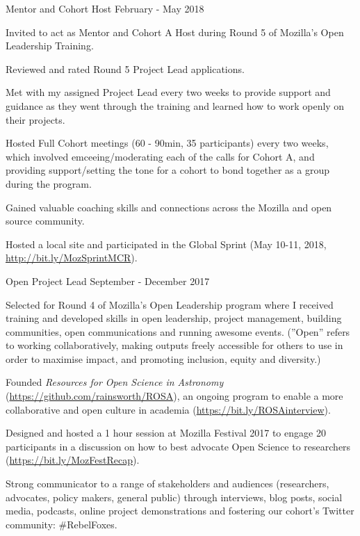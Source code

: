 \begin{cventries}
{    }
\cventry
    {Mentor and Cohort Host}
    {}
    {}
    {February - May 2018}
    {
      \begin{cvitems}
        \item{Invited to act as Mentor and Cohort A Host during Round 5 of Mozilla's Open Leadership Training.}
        \item{Reviewed and rated Round 5 Project Lead applications.}
        \item{Met with my assigned Project Lead every two weeks to provide support and guidance as they went through the training and learned how to work openly on their projects.}
        \item{Hosted Full Cohort meetings (60 - 90min, 35 participants) every two weeks, which involved emceeing/moderating each of the calls for Cohort A, and providing support/setting the tone for a cohort to bond together as a group during the program.}
        \item{Gained valuable coaching skills and connections across the Mozilla and open source community.}
        \item{Hosted a local site and participated in the Global Sprint (May 10-11, 2018, \url{http://bit.ly/MozSprintMCR}).}
      \end{cvitems}
    }
\cventry
    {Open Project Lead}
    {}
    {}
    {September - December 2017}
    {
      \begin{cvitems}
        \item{Selected for Round 4 of Mozilla's Open Leadership program where I received training and developed skills in open leadership, project management, building communities, open communications and running awesome events. (''Open'' refers to working collaboratively, making outputs freely accessible for others to use in order to maximise impact, and promoting inclusion, equity and diversity.)}
        \item{Founded \textit{Resources for Open Science in Astronomy} (\url{https://github.com/rainsworth/ROSA}), an ongoing program to enable a more collaborative and open culture in academia (\url{https://bit.ly/ROSAinterview}).}
        \item {Designed and hosted a 1 hour session at Mozilla Festival 2017 to engage 20 participants in a discussion on how to best advocate Open Science to researchers (\url{https://bit.ly/MozFestRecap}).}
        \item {Strong communicator to a range of stakeholders and audiences (researchers, advocates, policy makers, general public) through interviews, blog posts, social media, podcasts, online project demonstrations and fostering our cohort's Twitter community: \#RebelFoxes.}
      \end{cvitems}
    }    
\end{cventries}
